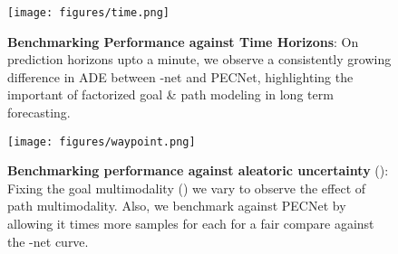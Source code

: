 \documentclass[final]{cvpr}
\begin{document}
\begin{figure}

\begin{center}
\texttt{[image: figures/time.png]}
\end{center}
  \caption{\textbf{Benchmarking Performance against Time Horizons}: On prediction horizons upto a minute, we observe a consistently growing difference in ADE between -net and PECNet, highlighting the important of factorized goal \& path modeling in long term forecasting.}
\label{fig:time}

\end{figure}

\begin{figure}
    \centering
    \texttt{[image: figures/waypoint.png]}

    \caption{\small{\textbf{Benchmarking performance against aleatoric uncertainty} (): Fixing the goal multimodality () we vary  to observe the effect of path multimodality. Also, we benchmark against PECNet by allowing it  times more samples for each  for a fair compare against the  -net curve.}}
    \label{fig:vary_k_e}

\end{figure}
\end{document}
